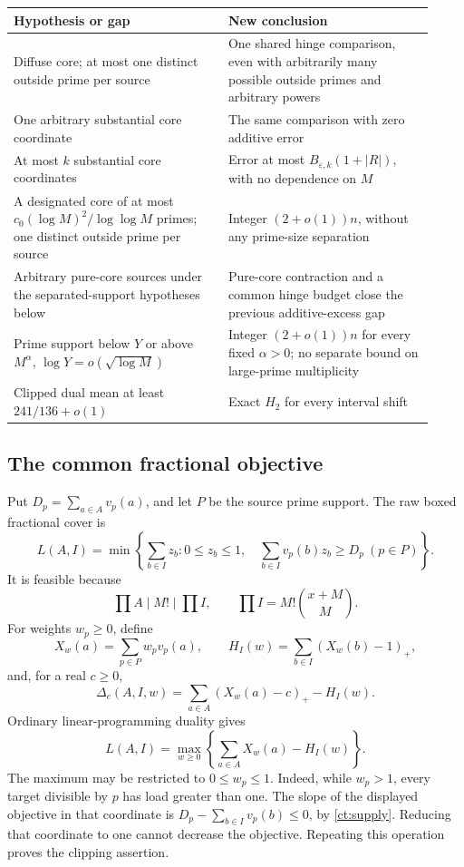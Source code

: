 \documentclass[11pt,a4paper]{article}
\theoremstyle{remark}
\begin{document}
\begin{center}
\small
\begin{tabular}{p{0.47\linewidth}p{0.45\linewidth}}
\toprule
Hypothesis or gap & New conclusion\\
\midrule
Diffuse core; at most one distinct outside prime per source
& One shared hinge comparison, even with arbitrarily many possible outside primes and arbitrary powers\\
One arbitrary substantial core coordinate
& The same comparison with zero additive error\\
At most \(k\) substantial core coordinates
& Error at most \(B_{\varepsilon,k}(1+|R|)\), with no dependence on \(M\)\\
A designated core of at most \(c_0(\log M)^2/\log\log M\) primes; one distinct outside prime per source
& Integer \((2+o(1))n\), without any prime-size separation\\
Arbitrary pure-core sources under the separated-support hypotheses below
& Pure-core contraction and a common hinge budget close the previous additive-excess gap\\
Prime support below \(Y\) or above \(M^\alpha\), \(\log Y=o(\sqrt{\log M})\)
& Integer \((2+o(1))n\) for every fixed \(\alpha>0\); no separate bound on large-prime multiplicity\\
Clipped dual mean at least \(241/136+o(1)\)
& Exact \(H_2\) for every interval shift\\
\bottomrule
\end{tabular}
\end{center}

\subsection{The common fractional objective}

Put \(D_p=\sum_{a\in A}v_p(a)\), and let \(P\) be the source
prime support. The raw boxed fractional cover is
\begin{equation}
 L(A,I)=\min\left\{\sum_{b\in I}z_b:
 0\le z_b\le1,\quad
 \sum_{b\in I}v_p(b)z_b\ge D_p\ (p\in P)\right\}.
 \label{ct:lp}
\end{equation}
It is feasible because
\begin{equation}
 \prod A\mid M!\mid\prod I,
 \qquad \prod I=M!\binom{x+M}{M}.
 \label{ct:supply}
\end{equation}
For weights \(w_p\ge0\), define
\[
 X_w(a)=\sum_{p\in P}w_pv_p(a),\qquad
 H_I(w)=\sum_{b\in I}(X_w(b)-1)_+,
\]
and, for a real \(c\ge0\),
\[
 \Delta_c(A,I,w)=\sum_{a\in A}(X_w(a)-c)_+-H_I(w).
\]
Ordinary linear-programming duality gives
\begin{equation}
 L(A,I)=\max_{w\ge0}
 \left\{\sum_{a\in A}X_w(a)-H_I(w)\right\}.
 \label{ct:dual}
\end{equation}
The maximum may be restricted to \(0\le w_p\le1\). Indeed, while
\(w_p>1\), every target divisible by \(p\) has load greater than one.
The slope of the displayed objective in that coordinate is
\(D_p-\sum_{b\in I}v_p(b)\le0\), by \eqref{ct:supply}.
Reducing that coordinate to one cannot decrease the objective.
Repeating this operation proves the clipping assertion.
\end{document}

